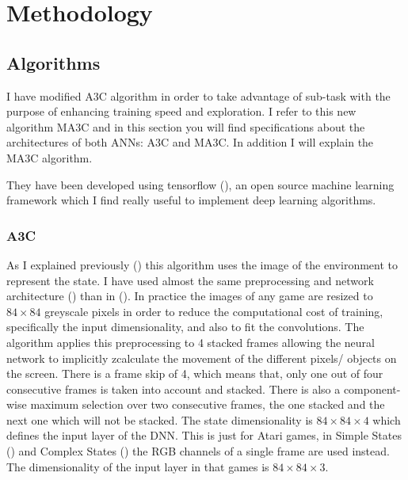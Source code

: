 \chapter{Methodology}

\section{Algorithms}

I have modified \ac{A3C} algorithm in order to take advantage of sub-task with the purpose of enhancing training speed
and exploration.
I refer to this new algorithm \acf{MA3C} and in this section you will find specifications about the architectures of
both \acp{ANN}: \ac{A3C} and \ac{MA3C}.
In addition I will explain the \ac{MA3C} algorithm.

They have been developed using tensorflow (\cite{tensorflow2015}), an open source machine learning framework which I find
really useful to implement deep learning algorithms.

\subsection{\acl{A3C}\label{subsec:AlgorithmA3C}}

As I explained previously () this algorithm uses the image of the environment to represent the state.
I have used almost the same preprocessing and network architecture () than in  (\cite{mnih2016A3C}).
In practice the images of any game are resized to $84 \times 84$ greyscale pixels in order to reduce the computational cost of training,
specifically the input dimensionality, and also to fit the convolutions.
The algorithm applies this preprocessing to 4 stacked frames allowing the neural network to implicitly zcalculate the movement
of the different pixels/ objects on the screen.
There is a frame skip of 4, which means that, only one out of four consecutive frames is taken into account and stacked.
There is also a component-wise maximum selection over two consecutive frames, the one stacked and the next one which will
not be stacked.
The state dimensionality is $84 \times 84 \times 4$ which defines the input layer of the \ac{DNN}.
This is just for Atari games, in Simple States () and Complex States ()
the RGB channels of a single frame are used instead.
The dimensionality of the input layer in that games is $84 \times 84 \times 3$.

